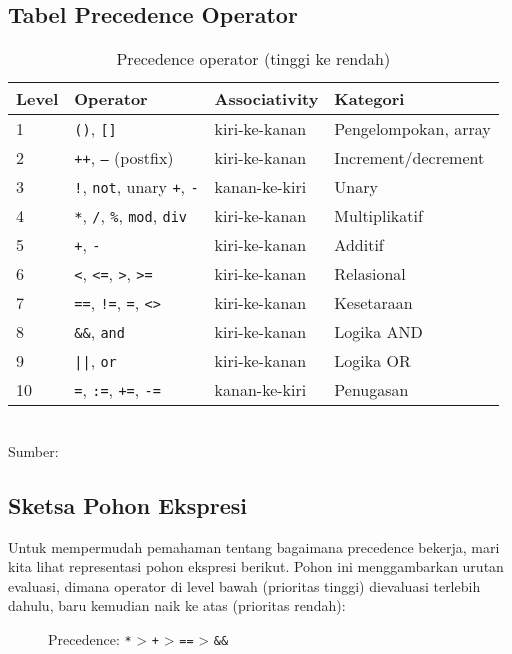 \documentclass[../main.tex]{subfiles}
\begin{document}
\subsection{Tabel Precedence Operator}
\begin{table}[H]
  \centering
  \caption{Precedence operator (tinggi ke rendah)}
  \begin{tabular}{@{}llll@{}}
    \toprule
    Level & Operator & Associativity & Kategori \\
    \midrule
    1 & \texttt{()}, \texttt{[]} & kiri-ke-kanan & Pengelompokan, array \\
    2 & \texttt{++}, \texttt{--} (postfix) & kiri-ke-kanan & Increment/decrement \\
    3 & \texttt{!}, \texttt{not}, unary \texttt{+}, \texttt{-} & kanan-ke-kiri & Unary \\
    4 & \texttt{*}, \texttt{/}, \texttt{\%}, \texttt{mod}, \texttt{div} & kiri-ke-kanan & Multiplikatif \\
    5 & \texttt{+}, \texttt{-} & kiri-ke-kanan & Additif \\
    6 & \texttt{<}, \texttt{<=}, \texttt{>}, \texttt{>=} & kiri-ke-kanan & Relasional \\
    7 & \texttt{==}, \texttt{!=}, \texttt{=}, \texttt{<>} & kiri-ke-kanan & Kesetaraan \\
    8 & \texttt{\&\&}, \texttt{and} & kiri-ke-kanan & Logika AND \\
    9 & \texttt{||}, \texttt{or} & kiri-ke-kanan & Logika OR \\
    10 & \texttt{=}, \texttt{:=}, \texttt{+=}, \texttt{-=} & kanan-ke-kiri & Penugasan \\
    \bottomrule
  \end{tabular}
  \\Sumber: \parencite{gnu-c-manual,cpp-op-precedence,c-op-precedence}
\end{table}

\subsection{Sketsa Pohon Ekspresi}
Untuk mempermudah pemahaman tentang bagaimana precedence bekerja, mari kita lihat representasi pohon ekspresi berikut. Pohon ini menggambarkan urutan evaluasi, dimana operator di level bawah (prioritas tinggi) dievaluasi terlebih dahulu, baru kemudian naik ke atas (prioritas rendah):

\begin{figure}[H]
  \centering
  \caption{Precedence: \texttt{*} \textgreater{} \texttt{+} \textgreater{} \texttt{==} \textgreater{} \texttt{\&\&}}
\end{figure}
\end{document}
